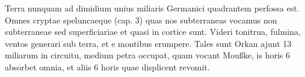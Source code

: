  \pstart {} Terra\protect{} nunquam  ad dimidium unius miliaris Germanici  quadrantem perfossa est. Omnes  cryptae speluncaeque (cap. 3) quas nos  subterraneas vocamus non subterraneae sed superficiariae et quasi in cortice sunt. Videri tonitrua, fulmina,  ventos generari sub terra, et e montibus erumpere. Tales sunt Orkan  ajunt    13 miliarum in circuitu, medium  petra occupat, quam vocant  Moußke, is horis 6 absorbet omnia, et aliis 6 horis quae displicent revomit.\pend 

